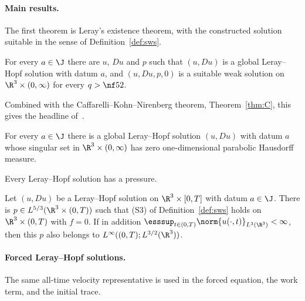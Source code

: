 \documentclass[11pt,reqno]{amsart}
\begin{document}
\paragraph{Main results.}
The first theorem is Leray's existence theorem, with the constructed
solution suitable in the sense of Definition~\ref{def:sws}.

\begin{theorem}[Existence]\label{thm:leray}
For every $a\in\J$ there are $u$, $Du$ and $p$ such that $(u,Du)$ is a global
Leray--Hopf solution with datum $a$, and $(u,Du,p,0)$ is a suitable weak
solution on $\R^3\times(0,\infty)$ for every $q>\nf52$.
\end{theorem}

Combined with the Caffarelli--Kohn--Nirenberg theorem, Theorem~\ref{thm:C},
this gives the headline of~\cite{CKN1982}.

\begin{corollary}\label{cor:ckn-headline}
For every $a\in\J$ there is a global Leray--Hopf solution $(u,Du)$ with datum
$a$ whose singular set in $\R^3\times(0,\infty)$ has zero one-dimensional
parabolic Hausdorff measure.
\end{corollary}

Every Leray--Hopf solution has a pressure.

\begin{theorem}\label{thm:assoc-pressure}
Let $(u,Du)$ be a Leray--Hopf solution on $\R^3\times[0,T]$ with datum
$a\in\J$. There is $p\in L^{5/3}(\R^3\times(0,T))$ such that (S3) of
Definition~\ref{def:sws} holds on $\R^3\times(0,T)$ with $f=0$. If in
addition $\esssup_{t\in(0,T)}\norm{u(\cdot,t)}_{L^3(\R^3)}<\infty$, then
this $p$ also belongs to $L^\infty((0,T);L^{3/2}(\R^3))$.
\end{theorem}

\paragraph{Forced Leray--Hopf solutions.}
The same all-time velocity representative is used in the forced equation,
the work term, and the initial trace.
\end{document}
